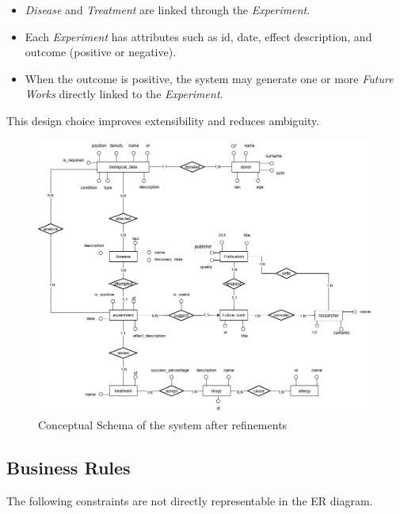 \documentclass[11pt,a4paper]{article}
\begin{document}
\begin{itemize}
    \item \textit{Disease} and \textit{Treatment} are linked through the \textit{Experiment}.
    \item Each \textit{Experiment} has attributes such as id, date, effect description, and outcome (positive or negative).
    \item When the outcome is positive, the system may generate one or more \textit{Future Works} directly linked to the \textit{Experiment}.
\end{itemize}

This design choice improves extensibility and reduces ambiguity.

\begin{figure}[H]
\centering
\includegraphics[width=1.1\textwidth]{img/Diagramma ER.drawio.png}
\caption{Conceptual Schema of the system after refinements}
\label{fig:conceptual-schema}
\end{figure}

\subsection{Business Rules}

The following constraints are not directly representable in the ER diagram.
\end{document}
